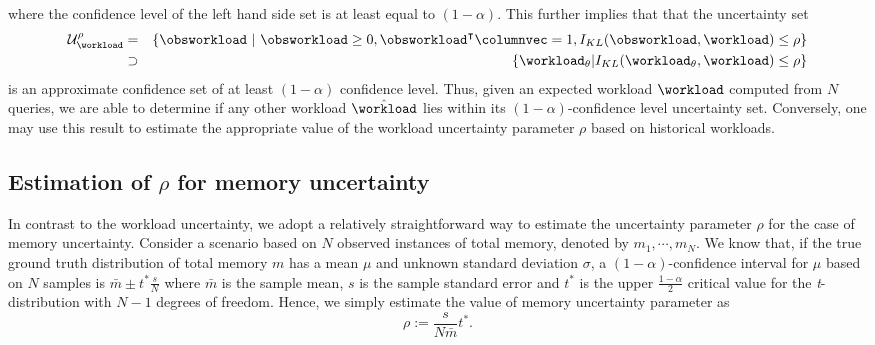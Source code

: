 where the confidence level of the left hand side set is at least equal to
$(1-\alpha)$.
This further implies that that the uncertainty set 
\begin{eqnarray}
    \mathcal{U}_{\workload}^\rho &=& \{\obsworkload\textrm{
        }|\textrm{  } \obsworkload
\geq 0, \obsworkload^\intercal\columnvec = 1, I_{KL}(\obsworkload,
\workload) \leq \rho\} \nonumber\\
&\supset& \{\workload_\theta | I_{KL}(\workload_\theta,
\workload) \leq \rho\}
\end{eqnarray}
is an approximate confidence set of at least $(1 - \alpha)$ confidence level.
Thus, given an expected workload $\workload$ computed from $N$ queries, 
    we are able to determine if any other workload $\hat{\workload}$ lies within 
    its $(1 - \alpha)$-confidence level uncertainty set.
Conversely, one may use this result to estimate the appropriate value of the 
    workload uncertainty parameter $\rho$ based on historical workloads.

\subsection{Estimation of $\rho$ for memory uncertainty}\label{sec:rhom}
In contrast to the workload uncertainty, we adopt a relatively straightforward
    way to estimate the uncertainty parameter $\rho$ for the case of memory
    uncertainty.
Consider a scenario based on $N$ observed instances of total memory, denoted by
    $m_1, \cdots, m_N$.
We know that, if the true ground truth distribution of total memory $m$ has a
    mean $\mu$ and unknown standard deviation $\sigma$, a $(1 - \alpha)$-confidence 
    interval for $\mu$ based on $N$ samples is $\bar{m} \pm t^*\frac{s}{N}$ 
    where $\bar{m}$ is the sample mean, $s$ is the sample standard error and
    $t^*$ is the upper $\frac{1 - \alpha}{2}$ critical value for the
    \emph{t}-distribution with $N-1$ degrees of freedom.
Hence, we simply estimate the value of memory uncertainty parameter as
\begin{equation}
    \rho := \frac{s}{N \bar{m}} t^*.
\end{equation}

